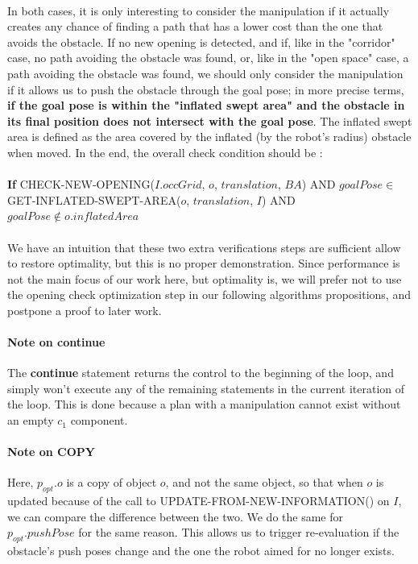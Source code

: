 \paragraph{} In both cases, it is only interesting to consider the manipulation if it actually creates any chance of finding a path that has a lower cost than the one that avoids the obstacle. If no new opening is detected, and if, like in the "corridor" case, no path avoiding the obstacle was found, or, like in the "open space" case, a path avoiding the obstacle was found, we should only consider the manipulation if it allows us to push the obstacle through the goal pose; in more precise terms, \textbf{if the goal pose is within the "inflated swept area" and the obstacle in its final position does not intersect with the goal pose}. The inflated swept area is defined as the area covered by the inflated (by the robot's radius) obstacle when moved. In the end, the overall check condition should be :

\paragraph{} \textbf{If} CHECK-NEW-OPENING($I.occGrid$, $o$, $translation$, $BA$) AND $goalPose \in$ GET-INFLATED-SWEPT-AREA($o$, $translation$, $I$) AND $goalPose \not\in o.inflatedArea$


\paragraph{} We have an intuition that these two extra verifications steps are sufficient allow to restore optimality, but this is no proper demonstration. Since performance is not the main focus of our work here, but optimality is, we will prefer not to use the opening check optimization step in our following algorithms propositions, and postpone a proof to later work.

\paragraph{Note on \textbf{continue}}\label{continue_note} The \textbf{continue} statement returns the control to the beginning of the loop, and simply won't execute any of the remaining statements in the current iteration of the loop. This is done because a plan with a manipulation cannot exist without an empty $c_{1}$ component.

\paragraph{Note on COPY}\label{copy_note} Here, $p_{opt}.o$ is a copy of object $o$, and not the same object, so that when $o$ is updated because of the call to UPDATE-FROM-NEW-INFORMATION() on $I$, we can compare the difference between the two. We do the same for $p_{opt}.pushPose$ for the same reason. This allows us to trigger re-evaluation if the obstacle's push poses change and the one the robot aimed for no longer exists.

